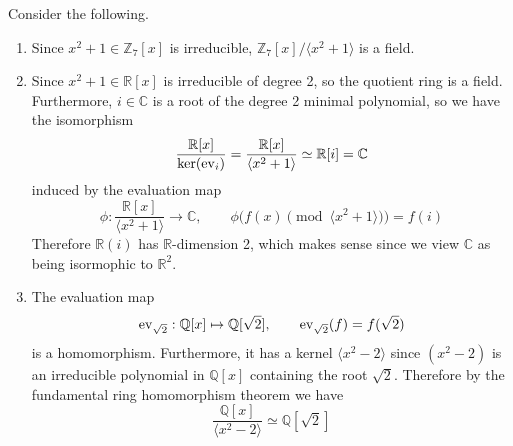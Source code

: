   \begin{example}
    Consider the following. 
    \begin{enumerate}
      \item Since $x^2 + 1 \in \mathbb{Z}_7 [x]$ is irreducible, $\mathbb{Z}_7 [x] / \langle x^2 + 1 \rangle$ is a field. 

      \item Since $x^2 + 1 \in \mathbb{R}[x]$ is irreducible of degree 2, so the quotient ring is a field. Furthermore, $i \in \mathbb{C}$ is a root of the degree 2 minimal polynomial, so we have the isomorphism 
      \begin{equation}
        \frac{\mathbb{R}[x]}{\ker(\ev_i)} = \frac{\mathbb{R}[x]}{\langle x^2 + 1 \rangle} \simeq \mathbb{R}[i] = \mathbb{C}
      \end{equation}
      induced by the evaluation map
      \begin{equation}
        \phi: \frac{\mathbb{R}[x]}{\langle x^2 + 1 \rangle} \rightarrow \mathbb{C}, \qquad \phi\big( f(x) \pmod{\langle x^2 + 1 \rangle} \big) = f(i)
      \end{equation}
      Therefore $\mathbb{R}(i)$ has $\mathbb{R}$-dimension 2, which makes sense since we view $\mathbb{C}$ as being isormophic to $\mathbb{R}^2$. 

      \item The evaluation map 
      \begin{equation}
        \ev_{\sqrt{2}}: \mathbb{Q}[x] \mapsto \mathbb{Q}[\sqrt{2}], \qquad \ev_{\sqrt{2}} (f) = f(\sqrt{2}) 
      \end{equation}
      is a homomorphism. Furthermore, it has a kernel $\langle x^2 - 2 \rangle$ since $(x^2 - 2)$ is an irreducible polynomial in $\mathbb{Q}[x]$ containing the root $\sqrt{2}$. Therefore by the fundamental ring homomorphism theorem we have 
      \begin{equation}
        \frac{\mathbb{Q}[x]}{\langle x^2 - 2 \rangle} \simeq \mathbb{Q}[\sqrt{2}]
      \end{equation}
    \end{enumerate}
  \end{example}

